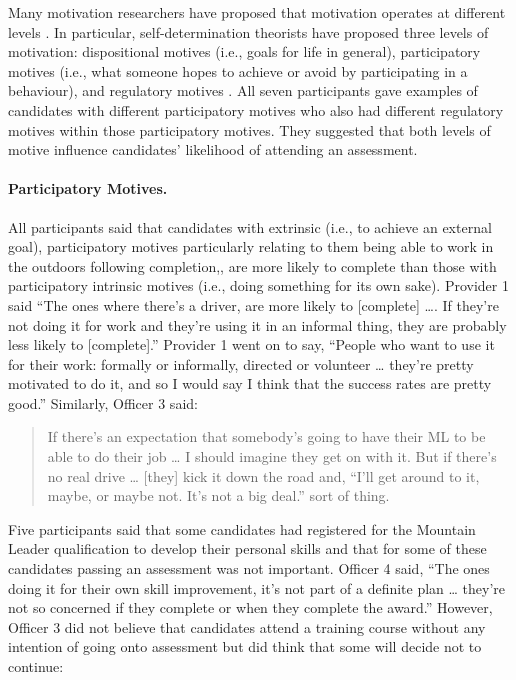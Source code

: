 \documentclass[
  12pt,
  a4paper,
]{book}
\begin{document}
Many motivation researchers have proposed that motivation operates at different levels \citep[e.g.,][]{Vallerand1997, Vallerand1992}. In particular, self-determination theorists have proposed three levels of motivation: dispositional motives (i.e., goals for life in general), participatory motives (i.e., what someone hopes to achieve or avoid by participating in a behaviour), and regulatory motives \citep[i.e., the perceived loci of causality of behavioural goals; e.g.,][]{Deci2000, Ingledew2009}. All seven participants gave examples of candidates with different participatory motives who also had different regulatory motives within those participatory motives. They suggested that both levels of motive influence candidates' likelihood of attending an assessment.

\hypertarget{qual-part-motives}{%
\paragraph{Participatory Motives.}\label{qual-part-motives}}

All participants said that candidates with extrinsic (i.e., to achieve an external goal), participatory motives particularly relating to them being able to work in the outdoors following completion,, are more likely to complete than those with participatory intrinsic motives (i.e., doing something for its own sake). Provider 1 said ``The ones where there's a driver, are more likely to {[}complete{]} \ldots. If they're not doing it for work and they're using it in an informal thing, they are probably less likely to {[}complete{]}.'' Provider 1 went on to say, ``People who want to use it for their work: formally or informally, directed or volunteer \ldots{} they're pretty motivated to do it, and so I would say I think that the success rates are pretty good.'' Similarly, Officer 3 said:

\begin{quote}
If there's an expectation that somebody's going to have their ML to be able to do their job \ldots{} I should imagine they get on with it. But if there's no real drive \ldots{} {[}they{]} kick it down the road and, ``I'll get around to it, maybe, or maybe not. It's not a big deal.'' sort of thing.
\end{quote}

Five participants said that some candidates had registered for the Mountain Leader qualification to develop their personal skills and that for some of these candidates passing an assessment was not important. Officer 4 said, ``The ones doing it for their own skill improvement, it's not part of a definite plan \ldots{} they're not so concerned if they complete or when they complete the award.'' However, Officer 3 did not believe that candidates attend a training course without any intention of going onto assessment but did think that some will decide not to continue:
\end{document}
